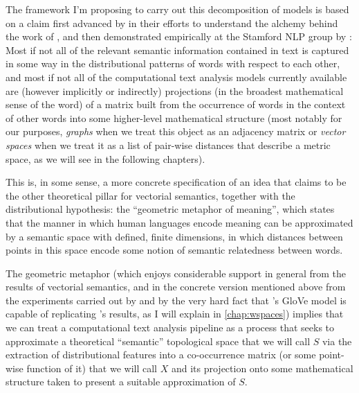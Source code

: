 The framework I'm proposing to carry out this decomposition of models is based on a claim first advanced by \citet{levy2014} in their efforts to understand the alchemy behind the work of \citet{mikolov2013,mikolov2013a}, and then demonstrated empirically at the Stamford NLP group by \citet{pennington2014}:
Most if not all of the relevant semantic information contained in text is captured in some way in the distributional patterns of words with respect to each other, and most if not all of the computational text analysis models currently available are (however implicitly or indirectly) projections (in the broadest mathematical sense of the word) of a matrix built from the occurrence of words in the context of other words into some higher-level mathematical structure (most notably for our purposes, \emph{graphs} when we treat this object as an adjacency matrix or \emph{vector spaces} when we treat it as a list of pair-wise distances that describe a metric space, as we will see in the following chapters).

This is, in some sense, a more concrete specification of an idea that \citeauthor{sahlgren2006} claims to be the other theoretical pillar for vectorial semantics, together with the distributional hypothesis: the ``geometric metaphor of meaning'', which states that the manner in which human languages encode meaning can be approximated by a semantic space with defined, finite dimensions, in which distances between points in this space encode some notion of semantic relatedness between words.

The geometric metaphor (which enjoys considerable support in general from the results of vectorial semantics, and in the concrete version mentioned above from the experiments carried out by \citeauthor{levy2014} and by the very hard fact that \citeauthor{pennington2014}'s GloVe model is capable of replicating \citeauthor{mikolov2013}'s results, as I will explain in \autoref{chap:wspaces}) implies that we can treat a computational text analysis pipeline as a process that seeks to approximate a theoretical ``semantic'' topological space that we will call $S$ via the extraction of distributional features into a co-occurrence matrix (or some point-wise function of it) that we will call $X$ and its projection onto some mathematical structure taken to present a  suitable approximation of $S$.


